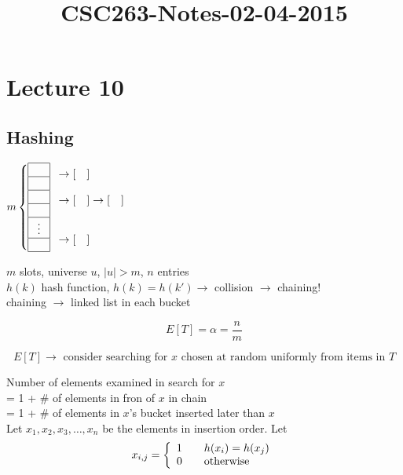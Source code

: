 



\title{CSC263-Notes-02-04-2015}



\section*{Lecture 10}

\subsection*{Hashing}

$ m \left \{ \begin{array}{| c |}
	\hline \quad \\ \hline
	\quad \\ \hline
	\quad \\ \hline
	\quad \\ \hline
	\vdots \\ \hline
	\quad \\ \hline
\end{array} \right . 
	\begin{array}{l}
	\rightarrow [\quad] \\ 
	\\ 
	\rightarrow [\quad]\rightarrow[\quad]\\ 
	\\ 
	\\ 
	\rightarrow [\quad] \\ 
\end{array} $

\noindent $m$ slots, universe $u$, $|u| > m$, $n$ entries \\
$h(k)$ hash function, $h(k) = h(k') \rightarrow$ collision $\rightarrow$ chaining! \\
chaining $\rightarrow$ linked list in each bucket

$$ E[T] = \alpha = \frac{n}{m} $$

$$ E[T] \rightarrow \textrm{ consider searching for }x\textrm{ chosen at random uniformly from items in }T $$ 

\noindent Number of elements examined in search for $x$ \\
= 1 + \# of elements in fron of $x$ in chain \\
= 1 + \# of elements in $x$'s bucket inserted later than $x$ \\

\noindent Let $x_1,x_2,x_3, \ldots, x_n$ be the elements in insertion order. Let\\
$$x_{i,j} = \left \{ \begin{array}{l l}
		1 & \quad h(x_i) = h(x_j) \\
		0 & \quad \textrm{otherwise}
\end{array} \right . $$


